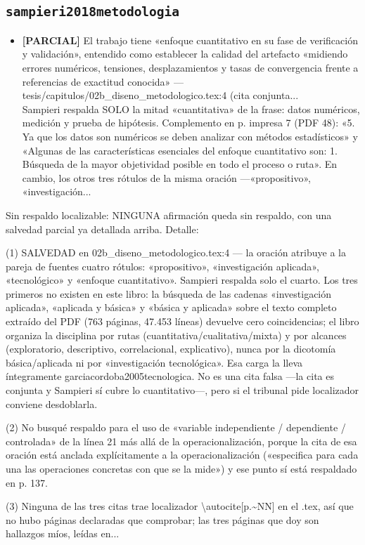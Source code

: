 \documentclass[11pt,a4paper]{article}
\newcommand{\campo}[1]{\textcolor{gris}{\footnotesize #1}}
\begin{document}
\subsection{\texttt{sampieri2018metodologia}}
\begin{itemize}\small
\item \textbf{[PARCIAL]} El trabajo tiene «enfoque cuantitativo en su fase de verificación y validación», entendido como establecer la calidad del artefacto «midiendo errores numéricos, tensiones, desplazamientos y tasas de convergencia frente a referencias de exactitud conocida» --- tesis/capitulos/02b\_diseno\_metodologico.tex:4 (cita conjunta...
\\ \campo{Sampieri respalda SOLO la mitad «cuantitativa» de la frase: datos numéricos, medición y prueba de hipótesis. Complemento en p. impresa 7 (PDF 48): «5. Ya que los datos son numéricos se deben analizar con métodos estadísticos» y «Algunas de las características esenciales del enfoque cuantitativo son: 1. Búsqueda de la mayor objetividad posible en todo el proceso o ruta». En cambio, los otros tres rótulos de la misma oración ---«propositivo», «investigación...}
\end{itemize}
{\small\campo{Sin respaldo localizable:} NINGUNA afirmación queda sin respaldo, con una salvedad parcial ya detallada arriba. Detalle:

(1) SALVEDAD en 02b\_diseno\_metodologico.tex:4 --- la oración atribuye a la pareja de fuentes cuatro rótulos: «propositivo», «investigación aplicada», «tecnológico» y «enfoque cuantitativo». Sampieri respalda solo el cuarto. Los tres primeros no existen en este libro: la búsqueda de las cadenas «investigación aplicada», «aplicada y básica» y «básica y aplicada» sobre el texto completo extraído del PDF (763 páginas, 47.453 líneas) devuelve cero coincidencias; el libro organiza la disciplina por rutas (cuantitativa/cualitativa/mixta) y por alcances (exploratorio, descriptivo, correlacional, explicativo), nunca por la dicotomía básica/aplicada ni por «investigación tecnológica». Esa carga la lleva íntegramente garciacordoba2005tecnologica. No es una cita falsa ---la cita es conjunta y Sampieri sí cubre lo cuantitativo---, pero si el tribunal pide localizador conviene desdoblarla.

(2) No busqué respaldo para el uso de «variable independiente / dependiente / controlada» de la línea 21 más allá de la operacionalización, porque la cita de esa oración está anclada explícitamente a la operacionalización («especifica para cada una las operaciones concretas con que se la mide») y ese punto sí está respaldado en p. 137.

(3) Ninguna de las tres citas trae localizador \textbackslash{}autocite[p.\textasciitilde{}NN] en el .tex, así que no hubo páginas declaradas que comprobar; las tres páginas que doy son hallazgos míos, leídas en...\par}
\end{document}
